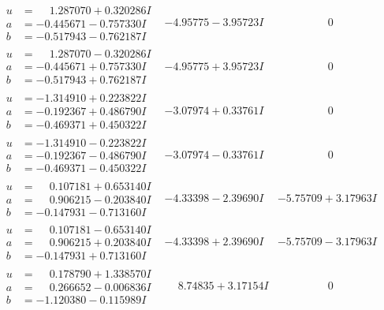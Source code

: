 \documentclass[1p]{elsarticle_modified}
\theoremstyle{definition}
\begin{document}
$$\begin{array}{c|c|c}
\begin{aligned}
u &= \phantom{-}1.287070 + 0.320286 I \\
a &= -0.445671 - 0.757330 I \\
b &= -0.517943 - 0.762187 I\end{aligned}
 & -4.95775 - 3.95723 I & \phantom{-0.000000 } 0 \\ \hline\begin{aligned}
u &= \phantom{-}1.287070 - 0.320286 I \\
a &= -0.445671 + 0.757330 I \\
b &= -0.517943 + 0.762187 I\end{aligned}
 & -4.95775 + 3.95723 I & \phantom{-0.000000 } 0 \\ \hline\begin{aligned}
u &= -1.314910 + 0.223822 I \\
a &= -0.192367 + 0.486790 I \\
b &= -0.469371 + 0.450322 I\end{aligned}
 & -3.07974 + 0.33761 I & \phantom{-0.000000 } 0 \\ \hline\begin{aligned}
u &= -1.314910 - 0.223822 I \\
a &= -0.192367 - 0.486790 I \\
b &= -0.469371 - 0.450322 I\end{aligned}
 & -3.07974 - 0.33761 I & \phantom{-0.000000 } 0 \\ \hline\begin{aligned}
u &= \phantom{-}0.107181 + 0.653140 I \\
a &= \phantom{-}0.906215 - 0.203840 I \\
b &= -0.147931 - 0.713160 I\end{aligned}
 & -4.33398 - 2.39690 I & -5.75709 + 3.17963 I \\ \hline\begin{aligned}
u &= \phantom{-}0.107181 - 0.653140 I \\
a &= \phantom{-}0.906215 + 0.203840 I \\
b &= -0.147931 + 0.713160 I\end{aligned}
 & -4.33398 + 2.39690 I & -5.75709 - 3.17963 I \\ \hline\begin{aligned}
u &= \phantom{-}0.178790 + 1.338570 I \\
a &= \phantom{-}0.266652 - 0.006836 I \\
b &= -1.120380 - 0.115989 I\end{aligned}
 & \phantom{-}8.74835 + 3.17154 I & \phantom{-0.000000 } 0 \\ \hline\begin{aligned}

\end{aligned}
\end{array}$$
\end{document}
